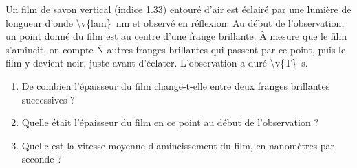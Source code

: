 Un film de savon vertical (indice \num{1.33}) entouré d'air est éclairé par une lumière de longueur d'onde \qty{\v{lam}}{nm} et observé en réflexion. Au début de l'observation, un point donné du film est au centre d'une frange brillante. À mesure que le film s'amincit, on compte \v{N} autres franges brillantes qui passent par ce point, puis le film y devient noir, juste avant d'éclater. L'observation a duré \qty{\v{T}}{s}.

\begin{enumerate}[label=\alph*)]
    \item De combien l'épaisseur du film change-t-elle entre deux franges brillantes successives ?
    \item Quelle était l'épaisseur du film en ce point au début de l'observation ?
    \item Quelle est la vitesse moyenne d'amincissement du film, en nanomètres par seconde ?
\end{enumerate}
